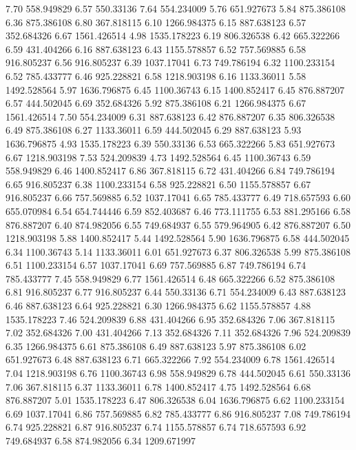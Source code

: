 7.70 	558.949829
6.57 	550.33136
7.64 	554.234009
5.76 	651.927673
5.84 	875.386108
6.36 	875.386108
6.80 	367.818115
6.10 	1266.984375
6.15 	887.638123
6.57 	352.684326
6.67 	1561.426514
4.98 	1535.178223
6.19 	806.326538
6.42 	665.322266
6.59 	431.404266
6.16 	887.638123
6.43 	1155.578857
6.52 	757.569885
6.58 	916.805237
6.56 	916.805237
6.39 	1037.17041
6.73 	749.786194
6.32 	1100.233154
6.52 	785.433777
6.46 	925.228821
6.58 	1218.903198
6.16 	1133.36011
5.58 	1492.528564
5.97 	1636.796875
6.45 	1100.36743
6.15 	1400.852417
6.45 	876.887207
6.57 	444.502045
6.69 	352.684326
5.92 	875.386108
6.21 	1266.984375
6.67 	1561.426514
7.50 	554.234009
6.31 	887.638123
6.42 	876.887207
6.35 	806.326538
6.49 	875.386108
6.27 	1133.36011
6.59 	444.502045
6.29 	887.638123
5.93 	1636.796875
4.93 	1535.178223
6.39 	550.33136
6.53 	665.322266
5.83 	651.927673
6.67 	1218.903198
7.53 	524.209839
4.73 	1492.528564
6.45 	1100.36743
6.59 	558.949829
6.46 	1400.852417
6.86 	367.818115
6.72 	431.404266
6.84 	749.786194
6.65 	916.805237
6.38 	1100.233154
6.58 	925.228821
6.50 	1155.578857
6.67 	916.805237
6.66 	757.569885
6.52 	1037.17041
6.65 	785.433777
6.49 	718.657593
6.60 	655.070984
6.54 	654.744446
6.59 	852.403687
6.46 	773.111755
6.53 	881.295166
6.58 	876.887207
6.40 	874.982056
6.55 	749.684937
6.55 	579.964905
6.42 	876.887207
6.50 	1218.903198
5.88 	1400.852417
5.44 	1492.528564
5.90 	1636.796875
6.58 	444.502045
6.34 	1100.36743
5.14 	1133.36011
6.01 	651.927673
6.37 	806.326538
5.99 	875.386108
6.51 	1100.233154
6.57 	1037.17041
6.69 	757.569885
6.87 	749.786194
6.74 	785.433777
7.45 	558.949829
6.77 	1561.426514
6.48 	665.322266
6.52 	875.386108
6.81 	916.805237
6.77 	916.805237
6.44 	550.33136
6.71 	554.234009
6.43 	887.638123
6.46 	887.638123
6.64 	925.228821
6.30 	1266.984375
6.62 	1155.578857
4.88 	1535.178223
7.46 	524.209839
6.88 	431.404266
6.95 	352.684326
7.06 	367.818115
7.02 	352.684326
7.00 	431.404266
7.13 	352.684326
7.11 	352.684326
7.96 	524.209839
6.35 	1266.984375
6.61 	875.386108
6.49 	887.638123
5.97 	875.386108
6.02 	651.927673
6.48 	887.638123
6.71 	665.322266
7.92 	554.234009
6.78 	1561.426514
7.04 	1218.903198
6.76 	1100.36743
6.98 	558.949829
6.78 	444.502045
6.61 	550.33136
7.06 	367.818115
6.37 	1133.36011
6.78 	1400.852417
4.75 	1492.528564
6.68 	876.887207
5.01 	1535.178223
6.47 	806.326538
6.04 	1636.796875
6.62 	1100.233154
6.69 	1037.17041
6.86 	757.569885
6.82 	785.433777
6.86 	916.805237
7.08 	749.786194
6.74 	925.228821
6.87 	916.805237
6.74 	1155.578857
6.74 	718.657593
6.92 	749.684937
6.58 	874.982056
6.34 	1209.671997
